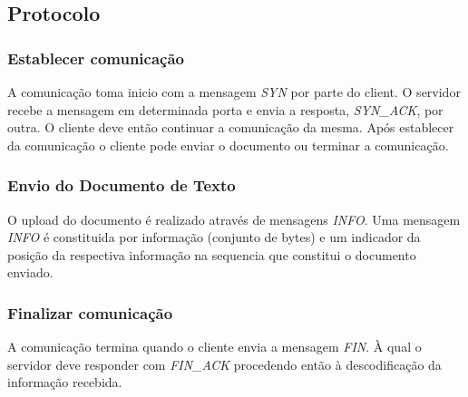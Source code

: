 \documentclass{llncs}
\begin{document}
\subsection{Protocolo}
\subsubsection{Establecer comunicação}
A comunicação toma inicio com a mensagem \textit{SYN} por parte do client. O servidor recebe a mensagem em determinada porta e envia a resposta, \textit{SYN\_ACK}, por outra. O cliente deve então continuar a comunicação da mesma. Após establecer da comunicação o cliente pode enviar o documento ou terminar a comunicação.
\subsubsection{Envio do Documento de Texto}
O upload do documento é realizado através de mensagens \textit{INFO}. Uma mensagem \textit{INFO} é constituida por informação (conjunto de bytes) e um indicador da posição da respectiva informação na sequencia que constitui o documento enviado.

\subsubsection{Finalizar comunicação}
A comunicação termina quando o cliente envia a mensagem \textit{FIN}. À qual o servidor deve responder com \textit{FIN\_ACK} procedendo então à descodificação da informação recebida.

\end{document}
